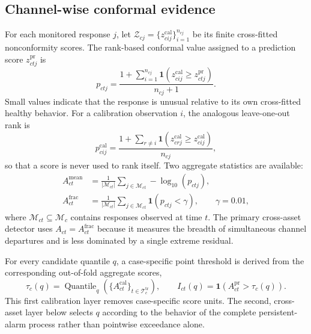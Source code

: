 \subsection{Channel-wise conformal evidence}

For each monitored response $j$, let
$\mathcal{Z}_{cj}=\{z^{\mathrm{cal}}_{cij}\}_{i=1}^{n_{cj}}$ be its finite
cross-fitted nonconformity scores. The rank-based conformal value assigned to a
prediction score $z^{\mathrm{pr}}_{ctj}$ is
\begin{equation}
p_{ctj}=
\frac{1+\sum_{i=1}^{n_{cj}}
\mathbf{1}\!\left(z^{\mathrm{cal}}_{cij}\geq z^{\mathrm{pr}}_{ctj}\right)}
{n_{cj}+1}.
\label{eq:conformal_pvalue}
\end{equation}
Small values indicate that the response is unusual relative to its own
cross-fitted healthy behavior. For a calibration observation $i$, the analogous
leave-one-out rank is
\begin{equation*}
p^{\mathrm{cal}}_{cij}=
\frac{1+\sum_{r\neq i}
\mathbf{1}\!\left(z^{\mathrm{cal}}_{crj}\geq z^{\mathrm{cal}}_{cij}\right)}
{n_{cj}},
\end{equation*}
so that a score is never used to rank itself. Two aggregate statistics are
available:
\begin{align}
A^{\mathrm{mean}}_{ct}
&=\frac{1}{|\mathcal{M}_{ct}|}
\sum_{j\in\mathcal{M}_{ct}}-\log_{10}(p_{ctj}),
\label{eq:mean_evidence}\\
A^{\mathrm{frac}}_{ct}
&=\frac{1}{|\mathcal{M}_{ct}|}
\sum_{j\in\mathcal{M}_{ct}}
\mathbf{1}(p_{ctj}<\gamma),\qquad \gamma=0.01,
\label{eq:fraction_evidence}
\end{align}
where $\mathcal{M}_{ct}\subseteq\mathcal{M}_c$ contains responses observed at
time $t$. The primary cross-asset detector uses
$A_{ct}=A^{\mathrm{frac}}_{ct}$ because it measures the breadth of simultaneous
channel departures and is less dominated by a single extreme residual.

For every candidate quantile $q$, a case-specific point threshold is derived
from the corresponding out-of-fold aggregate scores,
\begin{equation}
\tau_c(q)=\operatorname{Quantile}_{q}
\left(\{A^{\mathrm{cal}}_{ct}\}_{t\in\mathcal{T}^{\mathrm{tr}}_c}\right),
\qquad
I_{ct}(q)=\mathbf{1}\!\left(A^{\mathrm{pr}}_{ct}>\tau_c(q)\right).
\label{eq:point_firing}
\end{equation}
This first calibration layer removes case-specific score units. The second,
cross-asset layer below selects $q$ according to the behavior of the complete
persistent-alarm process rather than pointwise exceedance alone.


